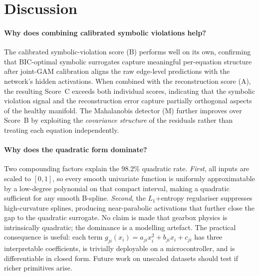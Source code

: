 \documentclass[conference]{IEEEtran}
\begin{document}
\section{Discussion}
\label{sec:discussion}

\paragraph*{Why does combining calibrated symbolic violations help?}
The calibrated symbolic-violation score (B)
performs well on its own, confirming that BIC-optimal symbolic surrogates
capture meaningful per-equation structure after joint-GAM
calibration aligns the raw edge-level predictions with the
network's hidden activations. When combined with the
reconstruction score (A), the resulting Score~C  exceeds
both individual scores, indicating that the symbolic violation
signal and the reconstruction error capture partially orthogonal
aspects of the healthy manifold.
The Mahalanobis detector (M) further
improves over Score~B by exploiting the \emph{covariance structure}
of the residuals rather than treating each equation independently.

\paragraph*{Why does the quadratic form dominate?}
Two compounding factors explain the $98.2\%$ quadratic rate.
\emph{First}, all inputs are scaled to $[0,1]$, so every smooth
univariate function is uniformly approximatable by a low-degree
polynomial on that compact interval, making a
quadratic sufficient for any smooth B-spline.
\emph{Second}, the $L_1$+entropy regulariser suppresses
high-curvature splines, producing near-parabolic activations that
further close the gap to the quadratic surrogate.
No claim is made that gearbox physics is intrinsically quadratic;
the dominance is a modelling artefact. The practical consequence is
useful: each term $g_{ji}(x_i)\!=\!a_{ji}x_i^2\!+\!b_{ji}x_i\!+\!c_{ji}$
has three interpretable coefficients, is trivially deployable on a
microcontroller, and is differentiable in closed form. Future work on
unscaled datasets should test if richer primitives arise.
\end{document}
